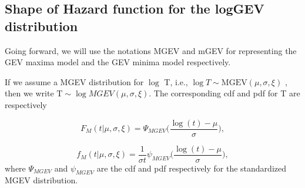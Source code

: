 \documentclass[smallextended]{svjour3}       %
\begin{document}
\subsection{Shape of Hazard function for the logGEV distribution}
Going forward, we will use the notations MGEV and mGEV for representing the GEV maxima model and the GEV minima
model respectively.


If we assume a MGEV distribution for $\log$ T, i.e., $\log T\sim\mbox{MGEV}(\mu,\sigma,\xi)$
, then we write $\mbox{T}\sim\log MGEV(\mu,\sigma,\xi)$. The corresponding cdf and pdf for T are respectively

\[
F_M(t|\mu,\sigma,\xi)=\Psi_{MGEV}\bigg(\frac{\log(t)-\mu}{\sigma}\bigg),
\]

\[
f_M(t|\mu,\sigma,\xi)=\frac{1}{\sigma t}\psi_{MGEV}\bigg(\frac{\log(t)-\mu}{\sigma}\bigg),
\]
where $\Psi_{MGEV}$ and $\psi_{MGEV}$ are the cdf and pdf respectively for the standardized MGEV distribution.
\end{document}
